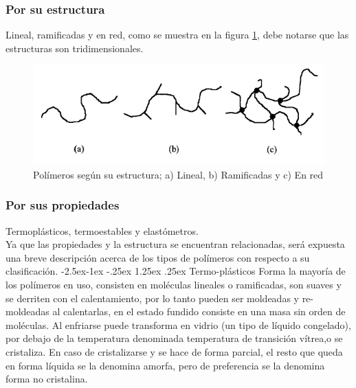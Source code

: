 \documentclass[a4paper, 11pt]{article}
\makeatletter
\renewcommand\paragraph{\@startsection{paragraph}{4}{\z@}%
            {-2.5ex\@plus -1ex \@minus -.25ex}%
            {1.25ex \@plus .25ex}%
            {\normalfont\normalsize\bfseries}}
\makeatother
\begin{document}
\subsubsection{Por su estructura} Lineal, ramificadas y en red, como se muestra en la figura \ref{lineal}, debe notarse que las estructuras son tridimensionales.\\
\begin{figure}[h!] 
\centering
\captionsetup{justification=centering}
    \includegraphics[scale=0.85]{clasestructura.png}
     \caption{Polímeros según su estructura; a) Lineal, b) Ramificadas y c) En red}
    \label{lineal}
\end{figure}
    
\subsubsection{Por sus propiedades} 
Termoplásticos, termoestables y elastómetros.\\

Ya que las propiedades y la estructura se encuentran relacionadas, será expuesta una breve descripción acerca de los tipos de polímeros con respecto a su clasificación.
\paragraph{Termo-plásticos} Forma la mayoría de los polímeros en uso, consisten en moléculas lineales o ramificadas, son suaves y se derriten con el calentamiento, por lo tanto pueden ser moldeadas y re-moldeadas al calentarlas, en el estado fundido consiste en una masa sin orden de moléculas. Al enfriarse puede transforma en vidrio (un tipo de líquido congelado), por debajo de la temperatura denominada temperatura de transición vítrea,o se cristaliza. En caso de cristalizarse y se hace de forma parcial, el resto que queda en forma líquida se la denomina amorfa, pero de preferencia se la denomina forma no cristalina.
\end{document}
